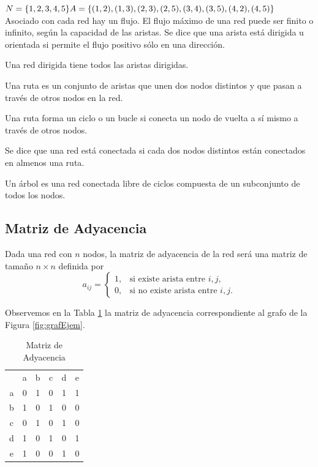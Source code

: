 \documentclass[12pt]{article}  %
\begin{document}
$N=\{ 1, 2, 3, 4, 5 \} \\ A = \{ (1,2), (1,3), (2,3), (2,5), (3,4), (3,5), (4,2), (4,5) \}$ \\

Asociado con cada red hay un flujo. El flujo máximo de una red puede ser finito o infinito, según la capacidad de las aristas. Se dice que una arista está dirigida u orientada si permite el flujo positivo sólo en una dirección.

Una red dirigida tiene todos las aristas dirigidas. 

Una ruta es un conjunto de aristas que unen dos nodos distintos y que pasan a través de otros nodos en la red.

Una ruta forma un ciclo o un bucle si conecta un nodo de vuelta a sí mismo a través de otros nodos.

Se dice que una red está conectada si cada dos nodos distintos están conectados en almenos una ruta.

Un árbol es una red conectada libre de ciclos compuesta de un subconjunto de todos los nodos.

\subsection{Matriz de Adyacencia}
Dada una red con $n$ nodos, la matriz de adyacencia de la red será una matriz de tamaño $n \times n$ definida por \[
a_{ij} =
\begin{cases}
    1, & \text{si existe arista entre } i, j, \\
    0, & \text{si no existe arista entre } i, j.
\end{cases}
\]

Observemos en la Tabla \ref{tab:matAdjEjem} la matriz de adyacencia correspondiente al grafo de la Figura \ref{fig:grafEjem}.

\begin{table}[H]
\centering
\caption{Matriz de Adyacencia}
\label{tab:matAdjEjem}
\begin{tabular}{cccccc}
&a&b&c&d&e\\
a&0&1&0&1&1\\
b&1&0&1&0&0\\
c&0&1&0&1&0\\
d&1&0&1&0&1\\
e&1&0&0&1&0
\end{tabular}
\end{table}
\end{document}

